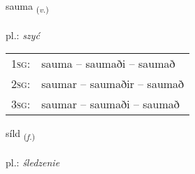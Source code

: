 \documentclass[frontgrid, backgrid]{flacards}\usepackage[]{graphicx}\usepackage[]{xcolor}
\begin{document}
\renewcommand{\flhead}{\vskip5pt \fboxsep=0pt {\small\bfseries\footnotesize Sagnorð | czasownik}}
\renewcommand{\fcfoot}{\vskip5pt \fboxsep=0pt \hspace{2pt}{\small\bfseries\footnotesize 3K}}

\renewcommand{\blhead}{\vskip5pt {\small\bfseries\footnotesize Sagnorð | czasownik }}
\renewcommand{\bcfoot}{\vskip5pt \hspace{2pt}{\small\bfseries\footnotesize 3K}}


{sauma \small{\textsubscript{(\textit{v.})}} \\[1ex] %
\textphonetic{[sœiːma]} \\
pl.: \emph{szyć} \\  [2ex]
\renewcommand*{\arraystretch}{0.8}
\begin{tabular}{p{1cm}l}
\textsc{1sg}: & sauma -- saumaði -- saumað \\ 
\textsc{2sg}: & saumar -- saumaðir -- saumað \\ 
\textsc{3sg}: & saumar -- saumaði -- saumað \\ 
\end{tabular}
}

\renewcommand{\flhead}{\vskip5pt \fboxsep=0pt {\small\bfseries\footnotesize Nafnorð | rzeczownik}}
\renewcommand{\fcfoot}{\vskip5pt \fboxsep=0pt \hspace{2pt}{\small\bfseries\footnotesize 3K}}

\renewcommand{\blhead}{\vskip5pt {\small\bfseries\footnotesize Nafnorð | rzeczownik }}
\renewcommand{\bcfoot}{\vskip5pt \hspace{2pt}{\small\bfseries\footnotesize 3K}}


{síld \small{\textsubscript{(\textit{f.})}} \\[1ex] %
\textphonetic{[silt]} \\
pl.: \emph{śledzenie} \\  [2ex]
\renewcommand*{\arraystretch}{0.8}
}
\end{document}
